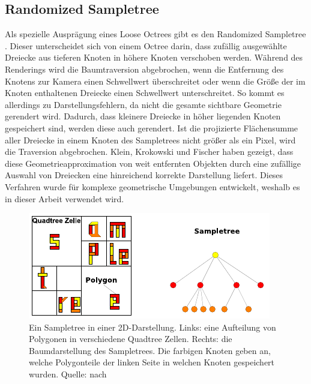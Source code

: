 \subsection{Randomized Sampletree}
\label{sec:basics:sampletree}
Als spezielle Ausprägung eines Loose Octrees gibt es den Randomized Sampletree \cite{klein}. Dieser unterscheidet sich von einem Octree darin, dass zufällig ausgewählte Dreiecke aus tieferen Knoten in höhere Knoten verschoben werden. Während des Renderings wird die Baumtraversion abgebrochen, wenn die Entfernung des Knotens zur Kamera einen Schwellwert überschreitet oder wenn die Größe der im Knoten enthaltenen Dreiecke einen Schwellwert unterschreitet. So kommt es allerdings zu Darstellungsfehlern, da nicht die gesamte sichtbare Geometrie gerendert wird. Dadurch, dass kleinere Dreiecke in höher liegenden Knoten gespeichert sind, werden diese auch gerendert. Ist die projizierte Flächensumme aller Dreiecke in einem Knoten des Sampletrees nicht größer als ein Pixel, wird die Traversion abgebrochen. Klein, Krokowski und Fischer \cite{klein} haben gezeigt, dass diese Geometrieapproximation von weit entfernten Objekten durch eine zufällige Auswahl von Dreiecken eine hinreichend korrekte Darstellung liefert. Dieses Verfahren wurde für komplexe geometrische Umgebungen entwickelt, weshalb es in dieser Arbeit verwendet wird.
\begin{figure}
 \centering
  \includegraphics[scale=1.7]{images/sampletree2.pdf}
  \caption{Ein Sampletree in einer 2D-Darstellung. Links: eine Aufteilung von Polygonen in verschiedene Quadtree Zellen. Rechts: die Baumdarstellung des Sampletrees. Die farbigen Knoten geben an, welche Polygonteile der linken Seite in welchen Knoten gespeichert wurden. Quelle: nach \cite{klein}}
 \label{fig:basics:sampletree}
\end{figure}

